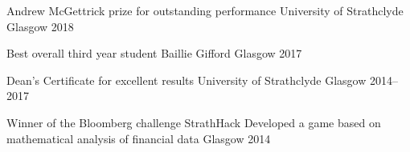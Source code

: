 

\begin{cvhonors}

  \cvhonor
    {Andrew McGettrick prize for outstanding performance} %
    {University of Strathclyde} %
    {Glasgow} %
    {2018} %

  \cvhonor
    {Best overall third year student} %
    {Baillie Gifford} %
    {Glasgow} %
    {2017} %

  \cvhonor
    {Dean's Certificate for excellent results} %
    {University of Strathclyde} %
    {Glasgow} %
    {2014--2017} %

  \cvhonor
    {Winner of the Bloomberg challenge} %
    {StrathHack \newline Developed a game based on mathematical analysis of financial data} %
    {Glasgow} %
    {2014} %

\end{cvhonors}
